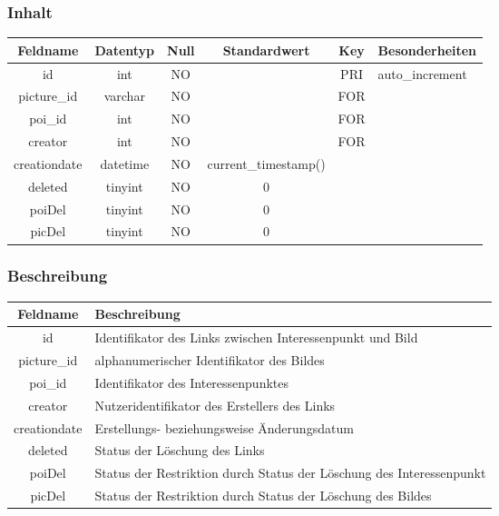 \subsubsection{Inhalt}
\begin{table}[H]
	\begin{tabular}{|c|c|c|c|c|p{3.5cm}|}
		\hline
		\textbf{Feldname} & \textbf{Datentyp} & \textbf{Null} & \textbf{Standardwert} & \textbf{Key}   & \textbf{Besonderheiten} \\ \hline
		id & int & NO &  & PRI & auto\_increment \\ \hline
		picture\_id & varchar & NO &  & FOR & \\ \hline
		poi\_id & int & NO &  & FOR & \\ \hline
		creator & int & NO &  & FOR & \\ \hline
		creationdate & datetime & NO & current\_timestamp() &  & \\ \hline
		deleted & tinyint & NO & 0 &  & \\ \hline
		poiDel & tinyint & NO & 0 &  & \\ \hline
		picDel & tinyint & NO & 0 &  & \\ \hline
	\end{tabular}
\end{table}
\subsubsection{Beschreibung}
\begin{table}[H]
	\begin{tabular}{|c|p{12cm}|}
		\hline
		\textbf{Feldname} & \textbf{Beschreibung} \\ \hline
		id & Identifikator des Links zwischen Interessenpunkt und Bild \\ \hline
		picture\_id & alphanumerischer Identifikator des Bildes \\ \hline
		poi\_id & Identifikator des Interessenpunktes \\ \hline
		creator & Nutzeridentifikator des Erstellers des Links \\ \hline
		creationdate & Erstellungs- beziehungsweise Änderungsdatum \\ \hline
		deleted & Status der Löschung des Links \\ \hline
		poiDel & Status der Restriktion durch Status der Löschung des Interessenpunkt \\ \hline
		picDel & Status der Restriktion durch Status der Löschung des Bildes \\ \hline
	\end{tabular}
\end{table}
